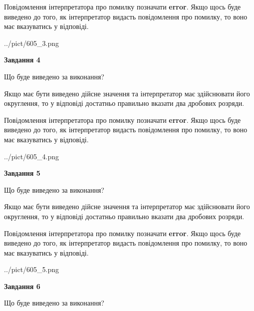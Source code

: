 \documentclass[12pt, ukrainian]{article}
\begin{document}
{\begin {Large}
Повідомлення інтерпретатора про помилку позначати \textbf{error}.
Якщо щось буде виведено до того, як інтерпретатор видасть повідомлення про помилку, 
то воно має вказуватись у відповіді. \par

\begin{center}
	{../pict/605_3.png}
\end{center}
\newpage

{\begin {center}\textbf{Завдання 4}\end {center}}\par
Що буде виведено за виконання? \par

Якщо має бути виведено дійсне значення та інтерпретатор має здійснювати його округлення, 
то у відповіді достатньо правильно вказати два дробових розряди.

Повідомлення інтерпретатора про помилку позначати \textbf{error}.
Якщо щось буде виведено до того, як інтерпретатор видасть повідомлення про помилку, 
то воно має вказуватись у відповіді. \par

\begin{center}
	{../pict/605_4.png}
\end{center}
\newpage

{\begin {center}\textbf{Завдання 5}\end {center}}\par
Що буде виведено за виконання? \par

Якщо має бути виведено дійсне значення та інтерпретатор має здійснювати його округлення, 
то у відповіді достатньо правильно вказати два дробових розряди.

Повідомлення інтерпретатора про помилку позначати \textbf{error}.
Якщо щось буде виведено до того, як інтерпретатор видасть повідомлення про помилку, 
то воно має вказуватись у відповіді. \par

\begin{center}
	{../pict/605_5.png}
\end{center}
\newpage

{\begin {center}\textbf{Завдання 6}\end {center}}\par
Що буде виведено за виконання? \par


\end{Large}}
\end{document}

